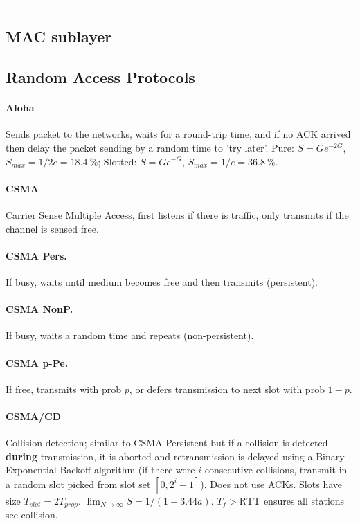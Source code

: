 \documentclass{form}
\begin{document}
\vspace{-1.5em}\rule{\textwidth}{1.0pt}\vspace{-1.0em}

\begin{multicols}{3}
    \section*{MAC sublayer}
    \subsection*{Random Access Protocols}
    \paragraph{Aloha     }
    Sends packet to the networks, waits for a round-trip time, and if no ACK arrived then delay the packet sending by a random time to 'try later'. Pure: $S=Ge^{-2G}$, $S_{max}=1/2e=\SI{18.4}{\percent}$; Slotted: $S=Ge^{-G}$, $S_{max}=1/e=\SI{36.8}{\percent}$.

    \paragraph{CSMA      }
    Carrier Sense Multiple Access, first listens if there is traffic, only transmits if the channel is sensed free.

    \paragraph{CSMA Pers.}
    If busy, waits until medium becomes free and then transmits (persistent).

    \paragraph{CSMA NonP.}
    If busy, waits a random time and repeats (non-persistent).

    \paragraph{CSMA p-Pe.}
    If free, transmits with prob $p$, or defers transmission to next slot with prob $1-p$.

    \paragraph{CSMA/CD   }
    Collision detection; similar to CSMA Persistent but if a collision is detected \textbf{during} transmission, it is aborted and retransmission is delayed using a Binary Exponential Backoff algorithm (if there were $i$ consecutive collisions, transmit in a random slot picked from slot set $[0, 2^i-1]$). Does not use ACKs. Slots have size $T_{slot}=2T_{prop}$. $\lim_{N \rightarrow\infty}{S}=1/(1+3.44a)$. $T_f > \text{RTT}$ ensures all stations see collision.


\end{multicols}
\end{document}
